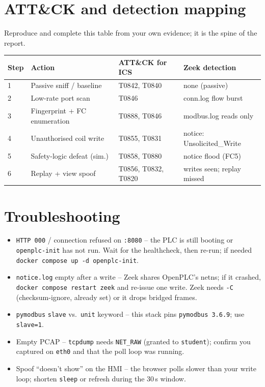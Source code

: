 \documentclass[11pt,a4paper]{article}
\begin{document}
\section*{ATT\&CK and detection mapping}

Reproduce and complete this table from your own evidence; it is the
spine of the report.

\begin{center}
\small
\begin{tabular}{@{}p{1.0cm}p{4.7cm}p{4.0cm}p{3.6cm}@{}}
\toprule
\textbf{Step} & \textbf{Action} & \textbf{ATT\&CK for ICS} & \textbf{Zeek detection} \\
\midrule
1 & Passive sniff / baseline      & T0842, T0840 & none (passive) \\
2 & Low-rate port scan            & T0846        & conn.log flow burst \\
3 & Fingerprint + FC enumeration  & T0888, T0846 & modbus.log reads only \\
4 & Unauthorised coil write       & T0855, T0831 & notice: Unsolicited\_Write \\
5 & Safety-logic defeat (sim.)    & T0858, T0880 & notice flood (FC5) \\
6 & Replay + view spoof           & T0856, T0832, T0820 & writes seen; replay missed \\
\bottomrule
\end{tabular}
\end{center}

\section*{Troubleshooting}

\begin{notebox}
\begin{itemize}\setlength{\itemsep}{1pt}
  \item \texttt{HTTP 000} / connection refused on \texttt{:8080} --
        the PLC is still booting or \texttt{openplc-init} has not run.
        Wait for the healthcheck, then re-run; if needed
        \texttt{docker compose up -d openplc-init}.
  \item \texttt{notice.log} empty after a write -- Zeek shares
        OpenPLC's netns; if it crashed, \texttt{docker compose restart
        zeek} and re-issue one write. Zeek needs \texttt{-C}
        (checksum-ignore, already set) or it drops bridged frames.
  \item \texttt{pymodbus} \texttt{slave} vs.\ \texttt{unit} keyword --
        this stack pins \texttt{pymodbus 3.6.9}; use \texttt{slave=1}.
  \item Empty PCAP -- \texttt{tcpdump} needs \texttt{NET\_RAW}
        (granted to \texttt{student}); confirm you captured on
        \texttt{eth0} and that the poll loop was running.
  \item Spoof ``doesn't show'' on the HMI -- the browser polls slower
        than your write loop; shorten \texttt{sleep} or refresh during
        the 30\,s window.
\end{itemize}
\end{notebox}
\end{document}
